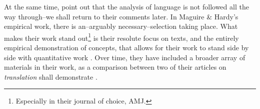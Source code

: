 At the same time, \citet{Lok2006} point out that the analysis of language is not followed all the way through--we shall return to their comments later. In Maguire \& Hardy's empirical work, there is an--arguably necessary--selection taking place. What makes their work stand out\footnote{Especially in their journal of choice, AMJ.} is their resolute focus on texts, and the entirely empirical demonstration of concepts, that allows for their work to stand side by side with quantitative work \citep[cf.][]{Phillips2004}. Over time, they have included a broader array of materials in their work, as a comparison between two of their articles on \textit{translation} shall demonstrate \citep{Maguire2009,Hardy2020}.